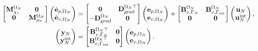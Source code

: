 \begin{tcolorbox}[colframe=red,title=Subdomain $\Omega_N$, coltitle=white]%
	\begin{equation}\label{eq:pHfindim_waves_OmN}
	\hspace*{-0.3cm}
	\begin{aligned}
	\begin{bmatrix}
	\mathbf{M}_{\chi_s}^{\Omega_N} & \mathbf{0} \\
	\mathbf{0} & \mathbf{M}_{\mu_0}^{\Omega_N} \\
	\end{bmatrix}
	\begin{pmatrix}
	\dot{\mathbf{e}}_{p, \Omega_N} \\
	\dot{\mathbf{e}}_{v, \Omega_N} \\
	\end{pmatrix}
	&= \begin{bmatrix}
	\mathbf{0} & \mathbf{D}_{\grad}^{\Omega_N \top}\\
	-\mathbf{D}_{\grad}^{\Omega_N} & \mathbf{0}\\
	\end{bmatrix}
	\begin{pmatrix}
	{\mathbf{e}}_{p, \Omega_N}\\
	{\mathbf{e}}_{v, \Omega_N}\\
	\end{pmatrix} + \begin{bmatrix}
	\mathbf{B}_{v, \Gamma_{N}}^{\Omega_N} & \mathbf{B}_{v, \Gamma_{\text{int}}}^{\Omega_N}\\
	\mathbf{0} & \mathbf{0}\\
	\end{bmatrix}
	\begin{pmatrix}
	\mathbf{u}_N \\
	\mathbf{u}_N^{\text{int}}
	\end{pmatrix}, \\
	\begin{pmatrix}
	\mathbf{y}_N \\
	\mathbf{y}_N^{\text{int}}
	\end{pmatrix} &=
	\begin{bmatrix}
	\mathbf{B}_{v, \Gamma_{N}}^{\Omega_N \top} & \mathbf{0} \\ 
	\mathbf{B}_{v, \Gamma_{\text{int}}}^{\Omega_N \top} & \mathbf{0}\\ 
	\end{bmatrix}
	\begin{pmatrix}
	{\mathbf{e}}_{p, \Omega_N} \\
	{\mathbf{e}}_{v, \Omega_N} \\
	\end{pmatrix}.
	\end{aligned}
	\end{equation}
\end{tcolorbox}


